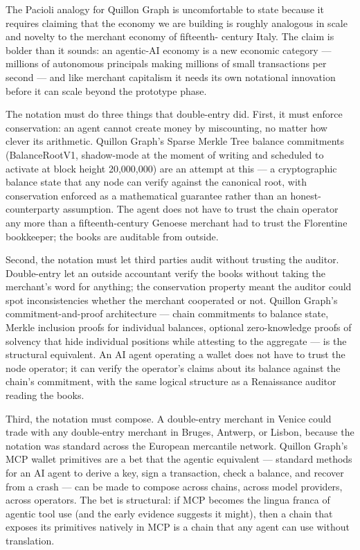 \documentclass[11pt,a4paper]{article}
\begin{document}
The Pacioli analogy for Quillon Graph is uncomfortable to state because
it requires claiming that the economy we are building is roughly
analogous in scale and novelty to the merchant economy of fifteenth-
century Italy. The claim is bolder than it sounds: an agentic-AI economy
is a new economic category --- millions of autonomous principals making
millions of small transactions per second --- and like merchant
capitalism it needs its own notational innovation before it can scale
beyond the prototype phase.

The notation must do three things that double-entry did. First, it must
enforce conservation: an agent cannot create money by miscounting, no
matter how clever its arithmetic. Quillon Graph's Sparse Merkle Tree
balance commitments (BalanceRootV1, shadow-mode at the moment of writing
and scheduled to activate at block height 20,000,000) are an attempt at
this --- a cryptographic balance state that any node can verify against
the canonical root, with conservation enforced as a mathematical
guarantee rather than an honest-counterparty assumption. The agent does
not have to trust the chain operator any more than a fifteenth-century
Genoese merchant had to trust the Florentine bookkeeper; the books are
auditable from outside.

Second, the notation must let third parties audit without trusting the
auditor. Double-entry let an outside accountant verify the books without
taking the merchant's word for anything; the conservation property meant
the auditor could spot inconsistencies whether the merchant cooperated or
not. Quillon Graph's commitment-and-proof architecture --- chain
commitments to balance state, Merkle inclusion proofs for individual
balances, optional zero-knowledge proofs of solvency that hide individual
positions while attesting to the aggregate --- is the structural
equivalent. An AI agent operating a wallet does not have to trust the
node operator; it can verify the operator's claims about its balance
against the chain's commitment, with the same logical structure as a
Renaissance auditor reading the books.

Third, the notation must compose. A double-entry merchant in Venice
could trade with any double-entry merchant in Bruges, Antwerp, or
Lisbon, because the notation was standard across the European mercantile
network. Quillon Graph's MCP wallet primitives are a bet that the
agentic equivalent --- standard methods for an AI agent to derive a key,
sign a transaction, check a balance, and recover from a crash --- can be
made to compose across chains, across model providers, across operators.
The bet is structural: if MCP becomes the lingua franca of agentic tool
use (and the early evidence suggests it might), then a chain that
exposes its primitives natively in MCP is a chain that any agent can use
without translation.
\end{document}
